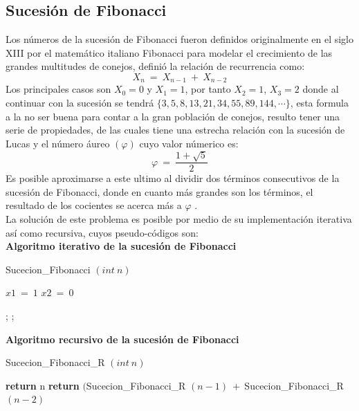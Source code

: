 \documentclass[12pt,twoside]{article}
\begin{document}
\subsection{Sucesi\'on de Fibonacci}
Los n\'umeros de la sucesi\'on de Fibonacci fueron definidos originalmente en el siglo XIII por el matem\'atico italiano Fibonacci para modelar el crecimiento de las grandes multitudes de conejos, definió la relación de recurrencia como:
$$X_{n}~=~X_{n-1}~+~X_{n-2}$$
Los principales casos son $X_{0}=0$ y $X_{1}=1$, por tanto $X_{2}=1$, $X_{3}=2$ donde al continuar con la sucesi\'on se tendr\'a $\{3, 5, 8, 13, 21, 34, 55, 89, 144,\cdots \}$, esta formula a la no ser buena para contar a la gran poblaci\'on de conejos, resulto tener una serie de propiedades, de las cuales tiene una estrecha relaci\'on con la sucesi\'on de Lucas y el n\'umero \'aureo $(\varphi)$ cuyo valor n\'umerico es:
$$\varphi~=~\frac{1+\sqrt{5}}{2}$$
Es posible aproximarse a este ultimo al dividir dos t\'erminos consecutivos de la sucesi\'on de Fibonacci, donde en cuanto m\'as grandes son los t\'erminos, el resultado de los cocientes se acerca m\'as a $\varphi$ .\\
La soluci\'on de este problema es posible por medio de su implementación iterativa as\'i como recursiva, cuyos pseudo-c\'odigos son:\\
\textbf{Algoritmo iterativo de la sucesi\'on de Fibonacci\\}
\begin{algorithm}[H]
  \caption{Sucecion\_Fibonacci $(int~n)$}
  \begin{algorithmic}[1]
 
    \State $x1~=~1$
    \State $x2~=~0$
 
      ;
      ;
    \EndFor
  \end{algorithmic}
\end{algorithm}
\textbf{Algoritmo recursivo de la sucesi\'on de Fibonacci}
\begin{algorithm}[H]
  \caption{Sucecion\_Fibonacci\_R $(int~n)$}
  \begin{algorithmic}[1]
    
      \State \textbf{return} n
    \Else
        \State \textbf{return} $($Sucecion\_Fibonacci\_R $(n-1)~+~$Sucecion\_Fibonacci\_R$(n-2)$
    \EndIf
  \end{algorithmic}
\end{algorithm}
\end{document}
